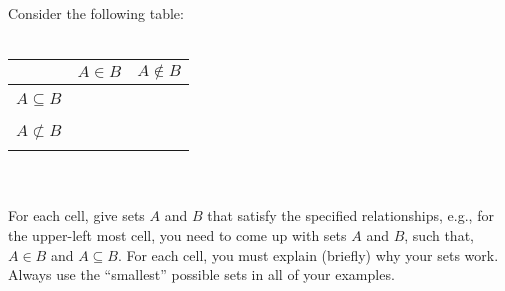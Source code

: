 \documentclass[12pt]{exam}
\begin{document}
\begin{questions}

	\question[6] Consider the following table: \\
    \\
    \begin{tabular}{r|c|c}
    	& $A \in B$ & $A \not \in B$ \\
        \hline
            & & \\
  $A \subseteq B$ & & \\
            & & \\
        \hline
                 & & \\
  $A \not \subset B$ & & \\
                 & & \\
        \hline
    \end{tabular}
    \\
    \\
    For each cell, give sets $A$ and $B$ that satisfy the specified relationships, e.g., for the upper-left most cell, you need to come up with sets $A$ and $B$, such that, $A \in B$ and $A \subseteq B$. For each cell, you must explain (briefly) why your sets work. Always use the ``smallest'' possible sets in all of your examples. 
		
		\fbox{\begin{minipage}[t]{14.55cm} \color{red}
			\vspace{25pt}
			

\end{minipage}}
\end{questions}
\end{document}
